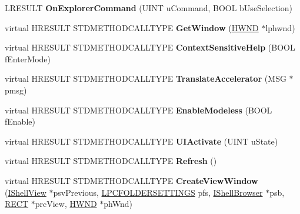 \begin{DoxyCompactItemize}
\mbox{\label{class_c_def_view_a6479af59440086f70a9886a91447dcb3}} 
L\+R\+E\+S\+U\+LT {\bfseries On\+Explorer\+Command} (U\+I\+NT u\+Command, B\+O\+OL b\+Use\+Selection)
\item 
\mbox{\label{class_c_def_view_a1300eccb4b27126508d8a9a03488a4b4}} 
virtual H\+R\+E\+S\+U\+LT S\+T\+D\+M\+E\+T\+H\+O\+D\+C\+A\+L\+L\+T\+Y\+PE {\bfseries Get\+Window} (\hyperlink{interfacevoid}{H\+W\+ND} $\ast$lphwnd)
\item 
\mbox{\label{class_c_def_view_ad18938f27e39e43fbf849de1f10da499}} 
virtual H\+R\+E\+S\+U\+LT S\+T\+D\+M\+E\+T\+H\+O\+D\+C\+A\+L\+L\+T\+Y\+PE {\bfseries Context\+Sensitive\+Help} (B\+O\+OL f\+Enter\+Mode)
\item 
\mbox{\label{class_c_def_view_aea35eacb613bb783f61982d98e7470a9}} 
virtual H\+R\+E\+S\+U\+LT S\+T\+D\+M\+E\+T\+H\+O\+D\+C\+A\+L\+L\+T\+Y\+PE {\bfseries Translate\+Accelerator} (M\+SG $\ast$pmsg)
\item 
\mbox{\label{class_c_def_view_a0fabddee693d5f7818efca881bc40d2f}} 
virtual H\+R\+E\+S\+U\+LT S\+T\+D\+M\+E\+T\+H\+O\+D\+C\+A\+L\+L\+T\+Y\+PE {\bfseries Enable\+Modeless} (B\+O\+OL f\+Enable)
\item 
\mbox{\label{class_c_def_view_aabd8e5b2650c85c91afec47d867d2213}} 
virtual H\+R\+E\+S\+U\+LT S\+T\+D\+M\+E\+T\+H\+O\+D\+C\+A\+L\+L\+T\+Y\+PE {\bfseries U\+I\+Activate} (U\+I\+NT u\+State)
\item 
\mbox{\label{class_c_def_view_a564a5040661d770e2b2b4d1dd5e710a7}} 
virtual H\+R\+E\+S\+U\+LT S\+T\+D\+M\+E\+T\+H\+O\+D\+C\+A\+L\+L\+T\+Y\+PE {\bfseries Refresh} ()
\item 
\mbox{\label{class_c_def_view_a022a0c41711af7bf9e95e1180d20cace}} 
virtual H\+R\+E\+S\+U\+LT S\+T\+D\+M\+E\+T\+H\+O\+D\+C\+A\+L\+L\+T\+Y\+PE {\bfseries Create\+View\+Window} (\hyperlink{interface_i_shell_view}{I\+Shell\+View} $\ast$psv\+Previous, \hyperlink{struct_f_o_l_d_e_r_s_e_t_t_i_n_g_s}{L\+P\+C\+F\+O\+L\+D\+E\+R\+S\+E\+T\+T\+I\+N\+GS} pfs, \hyperlink{interface_i_shell_browser}{I\+Shell\+Browser} $\ast$psb, \hyperlink{structtag_r_e_c_t}{R\+E\+CT} $\ast$prc\+View, \hyperlink{interfacevoid}{H\+W\+ND} $\ast$ph\+Wnd)

\end{DoxyCompactItemize}

